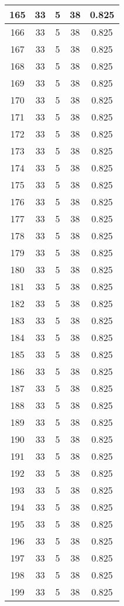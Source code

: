 \documentclass[letterpaper, 12pt]{article}
\begin{document}
\begin{longtable}{|c|c|c|c|c|}
\hline
165 & 33 & 5 & 38 & 0.825 \\
\hline
166 & 33 & 5 & 38 & 0.825 \\
\hline
167 & 33 & 5 & 38 & 0.825 \\
\hline
168 & 33 & 5 & 38 & 0.825 \\
\hline
169 & 33 & 5 & 38 & 0.825 \\
\hline
170 & 33 & 5 & 38 & 0.825 \\
\hline
171 & 33 & 5 & 38 & 0.825 \\
\hline
172 & 33 & 5 & 38 & 0.825 \\
\hline
173 & 33 & 5 & 38 & 0.825 \\
\hline
174 & 33 & 5 & 38 & 0.825 \\
\hline
175 & 33 & 5 & 38 & 0.825 \\
\hline
176 & 33 & 5 & 38 & 0.825 \\
\hline
177 & 33 & 5 & 38 & 0.825 \\
\hline
178 & 33 & 5 & 38 & 0.825 \\
\hline
179 & 33 & 5 & 38 & 0.825 \\
\hline
180 & 33 & 5 & 38 & 0.825 \\
\hline
181 & 33 & 5 & 38 & 0.825 \\
\hline
182 & 33 & 5 & 38 & 0.825 \\
\hline
183 & 33 & 5 & 38 & 0.825 \\
\hline
184 & 33 & 5 & 38 & 0.825 \\
\hline
185 & 33 & 5 & 38 & 0.825 \\
\hline
186 & 33 & 5 & 38 & 0.825 \\
\hline
187 & 33 & 5 & 38 & 0.825 \\
\hline
188 & 33 & 5 & 38 & 0.825 \\
\hline
189 & 33 & 5 & 38 & 0.825 \\
\hline
190 & 33 & 5 & 38 & 0.825 \\
\hline
191 & 33 & 5 & 38 & 0.825 \\
\hline
192 & 33 & 5 & 38 & 0.825 \\
\hline
193 & 33 & 5 & 38 & 0.825 \\
\hline
194 & 33 & 5 & 38 & 0.825 \\
\hline
195 & 33 & 5 & 38 & 0.825 \\
\hline
196 & 33 & 5 & 38 & 0.825 \\
\hline
197 & 33 & 5 & 38 & 0.825 \\
\hline
198 & 33 & 5 & 38 & 0.825 \\
\hline
199 & 33 & 5 & 38 & 0.825 \\
\hline
\end{longtable}
\end{document}
